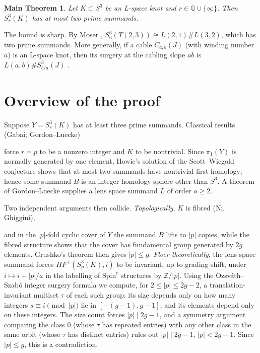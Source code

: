 \documentclass[11pt]{article}
\newtheorem*{maintheorem}{Main Theorem}
\theoremstyle{definition}
\newcommand{\Z}{\mathbb{Z}}
\newcommand{\Q}{\mathbb{Q}}
\newcommand{\HFp}{\mathit{HF}^+}
\newcommand{\Spinc}{\mathrm{Spin}^c}
\begin{document}
\begin{maintheorem}
Let $K\subset S^3$ be an L-space knot and $r\in\Q\cup\{\infty\}$. Then $S^3_r(K)$ has at most two prime summands.
\end{maintheorem}

The bound is sharp. By Moser \cite{Moser}, $S^3_6(T(2,3))\cong L(2,1)\# L(3,2)$, which has two prime summands. More generally, if a cable $C_{a,b}(J)$ (with winding number $a$) is an L-space knot, then its surgery at the cabling slope $ab$ is $L(a,b)\# S^3_{b/a}(J)$ \cite{Gordon83}.

\section*{Overview of the proof}

Suppose $Y=S^3_r(K)$ has at least three prime summands. Classical results (Gabai; Gordon--Luecke) 

force $r=p$ to be a nonzero integer and $K$ to be nontrivial. Since $\pi_1(Y)$ is normally generated by one element, Howie's solution of the Scott--Wiegold conjecture 
shows that at most two summands have nontrivial first homology; hence some summand $B$ is an integer homology sphere other than $S^3$. A theorem of Gordon--Luecke supplies a lens space summand $L$ of order $a\ge 2$.


Two independent arguments then collide. \emph{Topologically}, $K$ is fibred (Ni, Ghiggini), 


and in the $|p|$-fold cyclic cover of $Y$ the summand $B$ lifts to $|p|$ copies, while the fibred structure shows that the cover has fundamental group generated by $2g$ elements. Grushko's theorem then gives $|p|\le g$. \emph{Floer-theoretically}, the lens space summand forces $\HFp(S^3_p(K),i)$ to be invariant, up to grading shift, under $i\mapsto i+|p|/a$ in the labelling of $\Spinc$ structures by $\Z/|p|$. Using the Ozsv\'ath--Szab\'o integer surgery formula we compute, for $2\le |p|\le 2g-2$, a translation-invariant multiset $\tau$ of each such group: its size depends only on how many integers $s\equiv i \pmod{|p|}$ lie in $[-(g-1),g-1]$, and its elements depend only on these integers. The size count forces $|p|\mid 2g-1$, and a symmetry argument comparing the class $0$ (whose $\tau$ has repeated entries) with any other class in the same orbit (whose $\tau$ has distinct entries) rules out $|p|\mid 2g-1$, $|p|<2g-1$. Since $|p|\le g$, this is a contradiction.
\end{document}
